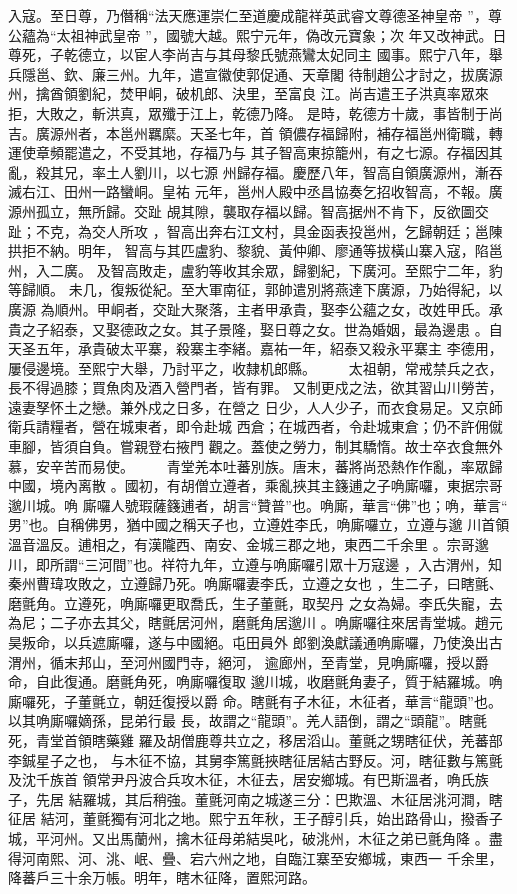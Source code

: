 \documentclass{ctexart}
\begin{document}
入寇。至日尊，乃僭稱``法天應運崇仁至道慶成龍祥英武睿文尊德圣神皇帝 ''，尊公蘊為``太祖神武皇帝 ''，國號大越。熙宁元年，偽改元寶象；次 年又改神武。日尊死，子乾德立，以宦人李尚吉与其母黎氏號燕鸞太妃同主 國事。熙宁八年，舉兵隱邕、欽、廉三州。九年，遣宣徽使郭促通、天章閣 待制趙公才討之，拔廣源州，擒酋領劉紀，焚甲峒，破机郎、決里，至富良 江。尚吉遣王子洪真率眾來拒，大敗之，斬洪真，眾殲于江上，乾德乃降。 是時，乾德方十歲，事皆制于尚吉。廣源州者，本邕州羈縻。天圣七年，首 領儂存福歸附，補存福邕州衛職，轉運使章頻罷遣之，不受其地，存福乃与 其子智高東掠籠州，有之七源。存福因其亂，殺其兄，率土人劉川，以七源 州歸存福。慶歷八年，智高自領廣源州，漸吞滅右江、田州一路蠻峒。皇祐 元年，邕州人殿中丞昌協奏乞招收智高，不報。廣源州孤立，無所歸。交趾 覘其隙，襲取存福以歸。智高据州不肯下，反欲圖交趾；不克，為交人所攻 ，智高出奔右江文村，具金函表投邕州，乞歸朝廷；邕陳拱拒不納。明年， 智高与其匹盧豹、黎貌、黃仲卿、廖通等拔橫山寨入寇，陷邕州，入二廣。 及智高敗走，盧豹等收其余眾，歸劉紀，下廣河。至熙宁二年，豹等歸順。 未几，復叛從紀。至大軍南征，郭帥遣別將燕達下廣源，乃始得紀，以廣源 為順州。甲峒者，交趾大聚落，主者甲承貴，娶李公蘊之女，改姓甲氏。承 貴之子紹泰，又娶德政之女。其子景隆，娶日尊之女。世為婚姻，最為邊患 。自天圣五年，承貴破太平寨，殺寨主李緒。嘉祐一年，紹泰又殺永平寨主 李德用，屢侵邊境。至熙宁大舉，乃討平之，收隸机郎縣。 　　太祖朝，常戒禁兵之衣，長不得過膝；買魚肉及酒入營門者，皆有罪。 又制更戍之法，欲其習山川勞苦，遠妻孥怀土之戀。兼外戍之日多，在營之 日少，人人少子，而衣食易足。又京師衛兵請糧者，營在城東者，即令赴城 西倉；在城西者，令赴城東倉；仍不許佣僦車腳，皆須自負。嘗親登右掖門 觀之。蓋使之勞力，制其驕惰。故士卒衣食無外慕，安辛苦而易使。 　　青堂羌本吐蕃別族。唐末，蕃將尚恐熱作作亂，率眾歸中國，境內离散 。國初，有胡僧立遵者，乘亂挾其主籛逋之子唃廝囉，東据宗哥邈川城。唃 廝囉人號瑕薩籛逋者，胡言``贊普''也。唃廝，華言``佛''也；唃，華言`` 男''也。自稱佛男，猶中國之稱天子也，立遵姓李氏，唃廝囉立，立遵与邈 川首領溫音溫反。逋相之，有漢隴西、南安、金城三郡之地，東西二千余里 。宗哥邈川，即所謂``三河間''也。祥符九年，立遵与唃廝囉引眾十万寇邊 ，入古渭州，知秦州曹瑋攻敗之，立遵歸乃死。唃廝囉妻李氏，立遵之女也 ，生二子，曰瞎氈、磨氈角。立遵死，唃廝囉更取喬氏，生子董氈，取契丹 之女為婦。李氏失寵，去為尼；二子亦去其父，瞎氈居河州，磨氈角居邈川 。唃廝囉往來居青堂城。趙元昊叛命，以兵遮廝囉，遂与中國絕。屯田員外 郎劉渙獻議通唃廝囉，乃使渙出古渭州，循末邦山，至河州國門寺，絕河， 逾廊州，至青堂，見唃廝囉，授以爵命，自此復通。磨氈角死，唃廝囉復取 邈川城，收磨氈角妻子，質于結羅城。唃廝囉死，子董氈立，朝廷復授以爵 命。瞎氈有子木征，木征者，華言``龍頭''也。以其唃廝囉嫡孫，昆弟行最 長，故謂之``龍頭''。羌人語倒，謂之``頭龍''。瞎氈死，青堂首領瞎藥雞 羅及胡僧鹿尊共立之，移居滔山。董氈之甥瞎征伏，羌蕃部李鋮星子之也， 与木征不協，其舅李篤氈挾瞎征居結古野反。河，瞎征數与篤氈及沈千族首 領常尹丹波合兵攻木征，木征去，居安鄉城。有巴斯溫者，唃氏族子，先居 結羅城，其后稍強。董氈河南之城遂三分：巴欺溫、木征居洮河澗，瞎征居 結河，董氈獨有河北之地。熙宁五年秋，王子醇引兵，始出路骨山，撥香子 城，平河州。又出馬蘭州，擒木征母弟結吳叱，破洮州，木征之弟已氈角降 。盡得河南熙、河、洮、岷、疊、宕六州之地，自臨江寨至安鄉城，東西一 千余里，降蕃戶三十余万帳。明年，瞎木征降，置熙河路。 
\end{document}
